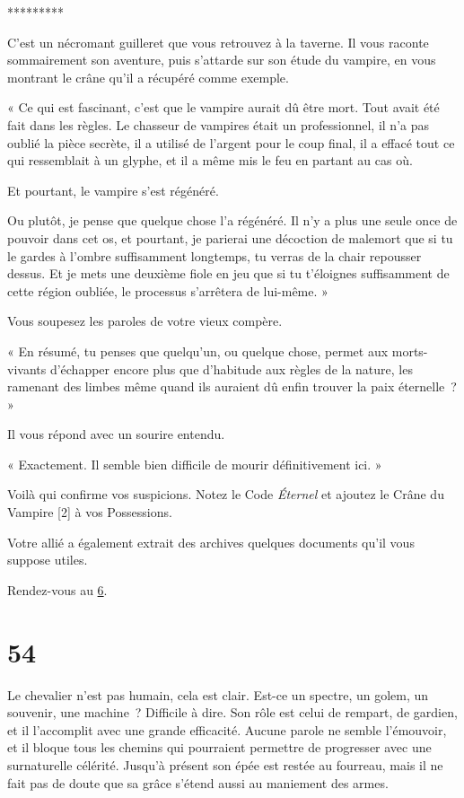 \documentclass{report}
\newcommand{\gsection}[1]{
    \section{#1}
    \label{section-#1}
}
\newcommand{\glink}[1]{\hyperref[section-#1]{#1}}
\newcommand{\ellipse}{
    \begin{center}
        *********
    \end{center}
}
\begin{document}
\ellipse

C'est un nécromant guilleret que vous retrouvez à la taverne. Il vous raconte sommairement son aventure, puis s'attarde sur son étude du vampire, en vous montrant le crâne qu'il a récupéré comme exemple.

« Ce qui est fascinant, c'est que le vampire aurait dû être mort. Tout avait été fait dans les règles. Le chasseur de vampires était un professionnel, il n'a pas oublié la pièce secrète, il a utilisé de l'argent pour le coup final, il a effacé tout ce qui ressemblait à un glyphe, et il a même mis le feu en partant au cas où.

Et pourtant, le vampire s'est régénéré.

Ou plutôt, je pense que quelque chose l'a régénéré. Il n'y a plus une seule once de pouvoir dans cet os, et pourtant, je parierai une décoction de malemort que si tu le gardes à l'ombre suffisamment longtemps, tu verras de la chair repousser dessus. Et je mets une deuxième fiole en jeu que si tu t'éloignes suffisamment de cette région oubliée, le processus s'arrêtera de lui-même. »

Vous soupesez les paroles de votre vieux compère.

« En résumé, tu penses que quelqu'un, ou quelque chose, permet aux morts-vivants d'échapper encore plus que d'habitude aux règles de la nature, les ramenant des limbes même quand ils auraient dû enfin trouver la paix éternelle ? »

Il vous répond avec un sourire entendu.

« Exactement. Il semble bien difficile de mourir définitivement ici. »

Voilà qui confirme vos suspicions. Notez le Code \emph{Éternel} et ajoutez le Crâne du Vampire [2] à vos Possessions.

Votre allié a également extrait des archives quelques documents qu'il vous suppose utiles.

Rendez-vous au \glink{6}.

\gsection{54}

Le chevalier n'est pas humain, cela est clair. Est-ce un spectre, un golem, un souvenir, une machine ? Difficile à dire. Son rôle est celui de rempart, de gardien, et il l'accomplit avec une grande efficacité. Aucune parole ne semble l'émouvoir, et il bloque tous les chemins qui pourraient permettre de progresser avec une surnaturelle célérité. Jusqu'à présent son épée est restée au fourreau, mais il ne fait pas de doute que sa grâce s'étend aussi au maniement des armes.
\end{document}
